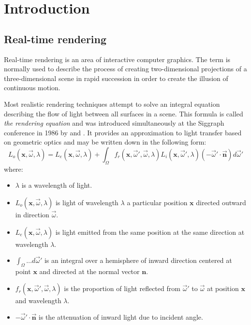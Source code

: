 
\chapter{ Introduction }
\label{Chapter1}

\section{Real-time rendering}

Real-time rendering is an area of interactive computer graphics. The term is normally used to describe the process of creating two-dimensional projections of a three-dimensional scene in rapid succession in order to create the illusion of continuous motion.

Most realistic rendering techniques attempt to solve an integral equation describing the flow of light between all surfaces in a scene. This formula is called \emph{the rendering equation} and was introduced simultaneously at the Siggraph conference in 1986 by \citet{Kajiya86RenderingEq} and \citet{Immel86}. It provides an approximation to light transfer based on geometric optics and may be written down in the following form:
\[
L_o(\mathbf x, \overrightarrow{\omega}, \lambda) = L_e(\mathbf x, \overrightarrow{\omega}, \lambda) + \int_\Omega f_r(\mathbf x, \overrightarrow{\omega}', \overrightarrow{\omega}, \lambda) L_i(\mathbf x, \overrightarrow{\omega}', \lambda) (-\overrightarrow{\omega}' \cdot \overrightarrow{\mathbf n}) d \overrightarrow{\omega}'
\]
where:
\begin{itemize}
\item $\lambda$ is a wavelength of light.
\item $L_o(\mathbf x, \overrightarrow{\omega}, \lambda)$ is light of wavelength $\lambda$ a particular position $\mathbf x$ directed outward in direction $\overrightarrow{\omega}$.
\item $L_e(\mathbf x, \overrightarrow{\omega}, \lambda)$ is light emitted from the same position at the same direction at wavelength $\lambda$.
\item $\int_\Omega \ldots d \overrightarrow{\omega}'$ is an integral over a hemisphere of inward direction centered at point $\mathbf x$ and directed at the normal vector $\mathbf n$.
\item $f_r(\mathbf x, \overrightarrow{\omega}', \overrightarrow{\omega}, \lambda)$ is the proportion of light reflected from $\overrightarrow{\omega}'$ to $\overrightarrow{\omega}$ at position $\mathbf x$ and wavelength $\lambda$.
\item $-\overrightarrow{\omega}' \cdot \overrightarrow{\mathbf n}$ is the attenuation of inward light due to incident angle.
\end{itemize}

